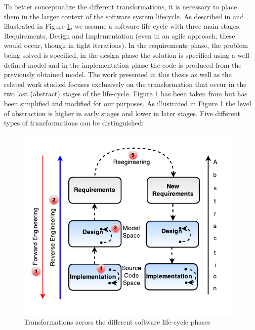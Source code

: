 To better conceptualize the different transformations, it is necessary to place them in the larger context of the software system lifecycle. As described in \cite{Chikofsky} and illustrated in Figure \ref{fig:reveng}, we assume a software life cycle with three main stages: Requirements, Design and Implementation (even in an agile approach, these would occur, though in tight iterations). In the requirements phase, the problem being solved is specified, in the design phase the solution is specified using a well-defined model and in the implementation phase the code is produced from the previously obtained model. The work presented in this thesis as well as the related work studied focuses exclusively on the transformation that occur in the two last (abstract) stages of the life-cycle. Figure \ref{fig:reveng} has been taken from \cite{Chikofsky} but has been simplified and modified for our purposes. As illustrated in Figure \ref{fig:reveng} the level of abstraction is higher in early stages and lower in later stages. Five different types of transformations can be distinguished:

\begin{figure}[h]
\centering
\includegraphics{Figures/transformationsRE}
\caption{Transformations across the different software life-cycle phases}
\label{fig:reveng}
\end{figure}

